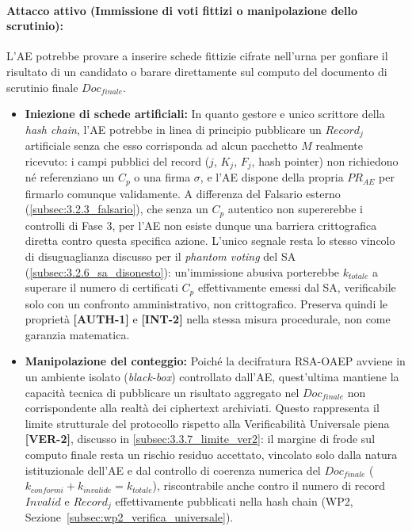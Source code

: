 \paragraph{Attacco attivo (Immissione di voti fittizi o manipolazione dello scrutinio):} L'AE potrebbe provare a inserire schede fittizie cifrate nell'urna per gonfiare il risultato di un candidato o barare direttamente sul computo del documento di scrutinio finale $Doc_{finale}$.
\begin{itemize}
    \item \textbf{Iniezione di schede artificiali:} In quanto gestore e unico scrittore della \textit{hash chain}, l'AE potrebbe in linea di principio pubblicare un $Record_j$ artificiale senza che esso corrisponda ad alcun pacchetto $M$ realmente ricevuto: i campi pubblici del record ($j$, $K_j$, $F_j$, hash pointer) non richiedono né referenziano un $C_p$ o una firma $\sigma$, e l'AE dispone della propria $PR_{AE}$ per firmarlo comunque validamente. A differenza del Falsario esterno (\ref{subsec:3.2.3_falsario}), che senza un $C_p$ autentico non supererebbe i controlli di Fase 3, per l'AE non esiste dunque una barriera crittografica diretta contro questa specifica azione. L'unico segnale resta lo stesso vincolo di disuguaglianza discusso per il \textit{phantom voting} del SA (\ref{subsec:3.2.6_sa_disonesto}): un'immissione abusiva porterebbe $k_{totale}$ a superare il numero di certificati $C_p$ effettivamente emessi dal SA, verificabile solo con un confronto amministrativo, non crittografico. Preserva quindi le proprietà \textbf{[AUTH-1]} e \textbf{[INT-2]} nella stessa misura procedurale, non come garanzia matematica.
    \item \textbf{Manipolazione del conteggio:} Poiché la decifratura RSA-OAEP avviene in un ambiente isolato (\textit{black-box}) controllato dall'AE, quest'ultima mantiene la capacità tecnica di pubblicare un risultato aggregato nel $Doc_{finale}$ non corrispondente alla realtà dei ciphertext archiviati. Questo rappresenta il limite strutturale del protocollo rispetto alla Verificabilità Universale piena \textbf{[VER-2]}, discusso in \ref{subsec:3.3.7_limite_ver2}: il margine di frode sul computo finale resta un rischio residuo accettato, vincolato solo dalla natura istituzionale dell'AE e dal controllo di coerenza numerica del $Doc_{finale}$ ($k_{conformi}+k_{invalide}=k_{totale}$), riscontrabile anche contro il numero di record $Invalid$ e $Record_j$ effettivamente pubblicati nella hash chain (WP2, Sezione~\ref{subsec:wp2_verifica_universale}).
\end{itemize}

